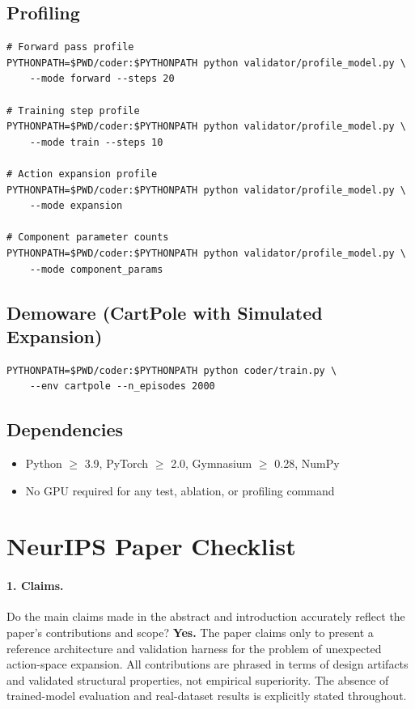 \documentclass{article}
\begin{document}
\subsection{Profiling}
\begin{verbatim}
# Forward pass profile
PYTHONPATH=$PWD/coder:$PYTHONPATH python validator/profile_model.py \
    --mode forward --steps 20

# Training step profile
PYTHONPATH=$PWD/coder:$PYTHONPATH python validator/profile_model.py \
    --mode train --steps 10

# Action expansion profile
PYTHONPATH=$PWD/coder:$PYTHONPATH python validator/profile_model.py \
    --mode expansion

# Component parameter counts
PYTHONPATH=$PWD/coder:$PYTHONPATH python validator/profile_model.py \
    --mode component_params
\end{verbatim}

\subsection{Demoware (CartPole with Simulated Expansion)}
\begin{verbatim}
PYTHONPATH=$PWD/coder:$PYTHONPATH python coder/train.py \
    --env cartpole --n_episodes 2000
\end{verbatim}

\subsection{Dependencies}
\begin{itemize}
  \item Python $\geq$ 3.9, PyTorch $\geq$ 2.0, Gymnasium $\geq$ 0.28, NumPy
  \item No GPU required for any test, ablation, or profiling command
\end{itemize}


\newpage
\section*{NeurIPS Paper Checklist}

\paragraph{1. Claims.}
Do the main claims made in the abstract and introduction accurately reflect the paper's contributions and scope?
\textbf{Yes.} The paper claims only to present a reference architecture and validation harness for the problem of unexpected action-space expansion. All contributions are phrased in terms of design artifacts and validated structural properties, not empirical superiority. The absence of trained-model evaluation and real-dataset results is explicitly stated throughout.
\end{document}
